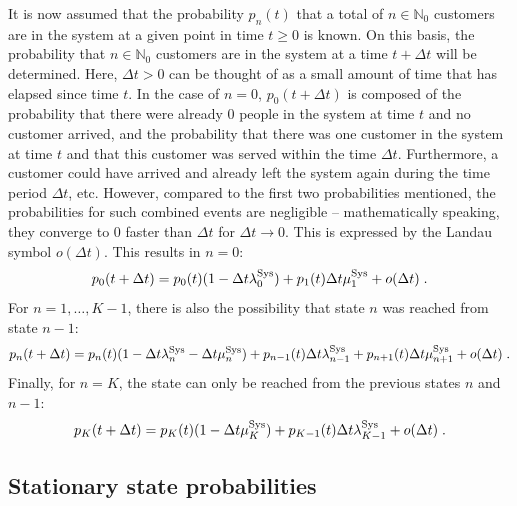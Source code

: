 \documentclass[a4paper,11pt,oneside]{article}
\theoremstyle{definition}
\begin{document}
It is now assumed that the probability $p_n(t)$ that a total of $n\in\mathbb{N}_0$ customers are in the system at a given point in time $t\ge0$ is known. On this basis, the probability that $n\in\mathbb{N}_0$ customers are in the system at a time $t+\Delta t$ will be determined. Here, $\Delta t>0$ can be thought of as a small amount of time that has elapsed since time $t$. In the case of $n=0$, $p_0(t+\Delta t)$ is composed of the probability that there were already 0 people in the system at time $t$ and no customer arrived, and the probability that there was one customer in the system at time $t$ and that this customer was served within the time $\Delta t$. Furthermore, a customer could have arrived and already left the system again during the time period $\Delta t$, etc. However, compared to the first two probabilities mentioned, the probabilities for such combined events are negligible -- mathematically speaking, they converge to 0 faster than $\Delta t$ for $\Delta t\to0$. This is expressed by the Landau symbol $o(\Delta t)$. This results in $n=0$:
$$
p_0(t+\Delta t)=
p_0(t)(1-\Delta t\lambda_0^{\rm Sys})+p_1(t)\Delta t\mu_1^{\rm Sys}+o(\Delta t)\;.
$$
For $n=1,\ldots,K-1$, there is also the possibility that state $n$ was reached from state $n-1$:
$$
p_n(t+\Delta t)=
p_n(t)(1-\Delta t\lambda_n^{\rm Sys}-\Delta t\mu_n^{\rm Sys})+p_{n-1}(t)\Delta t\lambda_{n-1}^{\rm Sys}+p_{n+1}(t)\Delta t\mu_{n+1}^{\rm Sys}+o(\Delta t)\;.
$$
Finally, for $n=K$, the state can only be reached from the previous states $n$ and $n-1$:
$$
p_K(t+\Delta t)=
p_K(t)(1-\Delta t\mu_K^{\rm Sys})+p_{K-1}(t)\Delta t\lambda_{K-1}^{\rm Sys}+o(\Delta t)\;.
$$

\subsection{Stationary state probabilities}
\end{document}
